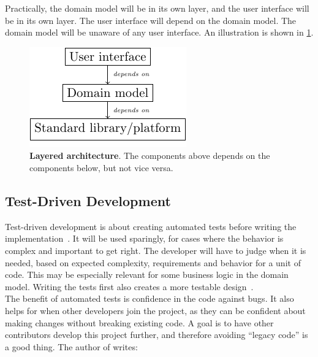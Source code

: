 Practically, the domain model will be in its own layer, and the user interface will be in its own layer.
The user interface will depend on the domain model.
The domain model will be unaware of any user interface.
An illustration is shown in \cref{fig:ddd-layered}.

\begin{figure}[htbp]  %
  \centering
  \includegraphics{figures/layered.pdf}
  \caption[Layered Architecture]{\textbf{Layered architecture}. The components above depends on the components below, but not vice versa.}\label{fig:ddd-layered}
\end{figure}


\subsection{Test-Driven Development}

Test-driven development is about creating automated tests before writing the implementation~\cite[p.~105]{knibergScrumXPTrenches2015}.
It will be used sparingly, for cases where the behavior is complex and important to get right.
The developer will have to judge when it is needed, based on expected complexity, requirements and behavior for a unit of code.
This may be especially relevant for some business logic in the domain model.
Writing the tests first also creates a more testable design~\cite[p.~106]{knibergScrumXPTrenches2015}.\\

The benefit of automated tests is confidence in the code against bugs.
It also helps for when other developers join the project, as they can be confident about making changes without breaking existing code.
A goal is to have other contributors develop this project further, and therefore avoiding ``legacy code'' is a good thing.
The author of  writes:

